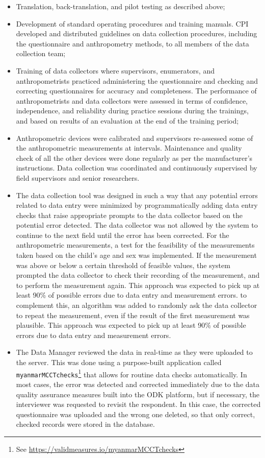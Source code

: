 \documentclass[12pt,a4paper]{article}
\let\rmarkdownfootnote\footnote%
\def\footnote{\protect\rmarkdownfootnote}
\begin{document}
\begin{itemize}
\item
  Translation, back-translation, and pilot testing as described above;
\item
  Development of standard operating procedures and training manuals. CPI developed and distributed guidelines on data collection procedures, including the questionnaire and anthropometry methods, to all members of the data collection team;
\item
  Training of data collectors where supervisors, enumerators, and anthropometrists practiced administering the questionnaire and checking and correcting questionnaires for accuracy and completeness. The performance of anthropometrists and data collectors were assessed in terms of confidence, independence, and reliability during practice sessions during the trainings, and based on results of an evaluation at the end of the training period;
\item
  Anthropometric devices were calibrated and supervisors re-assessed some of the anthropometric measurements at intervals. Maintenance and quality check of all the other devices were done regularly as per the manufacturer's instructions. Data collection was coordinated and continuously supervised by field supervisors and senior researchers.
\item
  The data collection tool was designed in such a way that any potential errors related to data entry were minimized by programmatically adding data entry checks that raise appropriate prompts to the data collector based on the potential error detected. The data collector was not allowed by the system to continue to the next field until the error has been corrected. For the anthropometric measurements, a test for the feasibility of the measurements taken based on the child's age and sex was implemented. If the measurement was above or below a certain threshold of feasible values, the system prompted the data collector to check their recording of the measurement, and to perform the measurement again. This approach was expected to pick up at least 90\% of possible errors due to data entry and measurement errors. to complement this, an algorithm was added to randomly ask the data collector to repeat the measurement, even if the result of the first measurement was plausible. This approach was expected to pick up at least 90\% of possible errors due to data entry and measurement errors.
\item
  The Data Manager reviewed the data in real-time as they were uploaded to the server. This was done using a purpose-built application called \texttt{myanmarMCCTchecks}\footnote{See \url{https://validmeasures.io/myanmarMCCTchecks}} that allows for routine data checks automatically. In most cases, the error was detected and corrected immediately due to the data quality assurance measures built into the ODK platform, but if necessary, the interviewer was requested to revisit the respondent. In this case, the corrected questionnaire was uploaded and the wrong one deleted, so that only correct, checked records were stored in the database.
\end{itemize}
\end{document}
